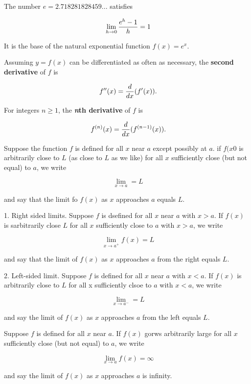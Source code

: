 \enddef

The number $e = 2.718281828459...$ satisfies

$$\
\lim_{h \to 0} {
e^h - 1
\over h
} = 1
$$

It is the base of the natural exponential function $f(x) = e^x$.
\enddef

Assuming $y = f(x)$ can be differentiated as often as necessary,
the {\bf second derivative} of $f$ is

$$\
f''(x) = {d \over dx}(f'(x)).
$$

For integers $n \ge 1$, the {\bf {\it n}th derivative} of $f$ is

$$\
f^{(n)}(x) = {d \over dx}(f^{(n - 1)}(x)).
$$

\enddef

Suppose the function $f$ is defined for all $x$ near $a$
except possibly at $a$. if $f(x0$ is arbitrarily close
to $L$ (as close to $L$ as we like) for all $x$ sufficiently
close (but not equal) to $a$, we write

$$\
\lim_{x \to a} = L
$$

and say that the limit fo $f(x)$ as $x$ approaches $a$ equals $L$.
\enddef

1. Right sided limits. Suppose $f$ is dsefined for all $x$
near $a$ with $x > a$. If $f(x)$ is sarbitrarily close $L$
for all $x$ sufficiently close to $a$ with $x > a$, we write

$$\
\lim_{x \to a^{+}} f(x) = L
$$

and say that the limit of $f(x)$ as $x$ approaches $a$
from the right equals $L$.

\par

2. Left-sided limit. Suppose $f$ is defined for all $x$
near $a$ with $x < a$. If $f(x)$ is arbitrarily close to $L$
for all x sufficiently clsoe to $a$ with $x < a$, we
write

$$\
\lim_{x \to a^{-}} = L
$$

and say the limit of $f(x)$ as $x$ approaches $a$ from
the left equals $L$.
\enddef

Suppose $f$ is defined for all $x$ near $a$. If $f(x)$
gorws arbitrarily large for all $x$ sufficiently close (but not equal)
to $a$, we write

$$\
\lim_{x \to a} f(x) = \infty
$$

and say the limit of $f(x)$ as $x$ approaches $a$ is
infinity.

